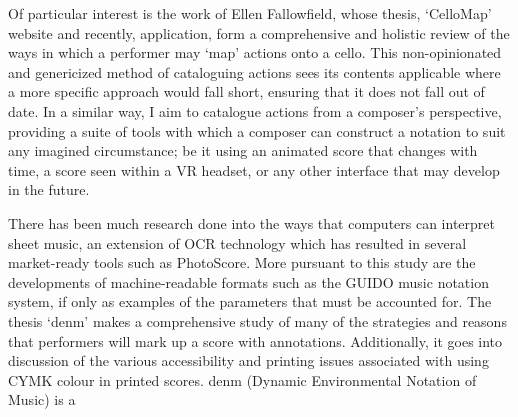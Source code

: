 Of particular interest is the work of Ellen Fallowfield, whose thesis, `CelloMap' website and recently, application, form a comprehensive and holistic review of the ways in which a performer may `map' actions onto a cello.\autocite[]{fallowfieldCelloMapHandbook2009,fallowfieldCelloMap}
This non-opinionated and genericized method of cataloguing actions sees its contents applicable where a more specific approach would fall short, ensuring that it does not fall out of date.
In a similar way, I aim to catalogue actions from a composer's perspective, providing a suite of tools with which a composer can construct a notation to suit any imagined circumstance; be it using an animated score that changes with time, a score seen within a VR headset, or any other interface that may develop in the future.

There has been much research done into the ways that computers can interpret sheet music, an extension of OCR technology which has resulted in several market-ready tools such as PhotoScore. 
More pursuant to this study are the developments of machine-readable formats such as the GUIDO music notation system, if only as examples of the parameters that must be accounted for.
The thesis `denm' makes a comprehensive study of many of the strategies and reasons that performers will mark up a score with annotations. 
Additionally, it goes into discussion of the various accessibility and printing issues associated with using CYMK colour in printed scores.\autocite[22--29]{beanDenmDynamicEnvironmental}
denm (Dynamic Environmental Notation of Music) is a 


